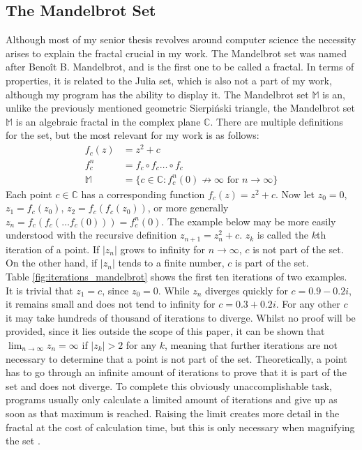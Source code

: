 \documentclass[12pt,a4paper,titlepage]{article}
\begin{document}
	\subsection{The Mandelbrot Set}
	Although most of my senior thesis revolves around computer science the necessity arises to explain the fractal crucial in my work. The Mandelbrot set was named after Benoît B. Mandelbrot, and is the first one to be called a fractal. In terms of properties, it is related to the Julia set, which is also not a part of my work, although my program has the ability to display it. The Mandelbrot set \(\mathbb{M}\) is an, unlike the previously mentioned geometric Sierpiński triangle, the Mandelbrot set \(\mathbb{M}\) is an algebraic fractal in the complex plane \(\mathbb{C}\). There are multiple definitions for the set, but the most relevant for my work is as follows:
	\begin{align*}
			f_{c}(z)&=z^2 + c\\
			f_{c}^{n} &= f_{c} \circ f_{c} \dots \circ f_{c}\\
			\mathbb{M} &= \{c \in \mathbb{C}: f_{c}^{n}(0)\not\to\infty \text{ for } n \to \infty\}
	\end{align*}
	Each point \(c \in \mathbb{C}\) has a corresponding function \(f_c(z)=z^2 +c\). Now let \(z_0=0\), \(z_1 = f_c(z_0)\), \(z_2 = f_c(f_c(z_0))\), or more generally \(z_n = f_c(f_c(\dots f_c(0)))= f_c^n(0)\). The example below may be more easily understood with the recursive definition \(z_{n+1}=z_n^2+c\). \(z_k\) is called the \(k\)th iteration of a point. If \(|z_n|\) grows to infinity for \(n \to \infty\), \(c\) is not part of the set. On the other hand, if \(|z_n|\) tends to a finite number, \(c\) is part of the set.\\
	Table \ref{fig:iterations_mandelbrot} shows the first ten iterations of two examples. It is trivial that \(z_1=c\), since \(z_0 = 0\). While \(z_n\) diverges quickly for \(c=0.9 - 0.2i\), it remains small and does not tend to infinity for \(c=0.3+0.2i\). For any other \(c\) it may take hundreds of thousand of iterations to diverge. Whilst no proof will be provided, since it lies outside the scope of this paper, it can be shown that \(\lim_{n\to\infty}z_{n} = \infty\) if \(|z_{k}| > 2\) for any \(k\), meaning that further iterations are not necessary to determine that a point is not part of the set. Theoretically, a point has to go through an infinite amount of iterations to prove that it is part of the set and does not diverge. To complete this obviously unaccomplishable task, programs usually only calculate a limited amount of iterations and give up as soon as that maximum is reached. Raising the limit creates more detail in the fractal at the cost of calculation time, but this is only necessary when magnifying the set \cite[Chapter 14.2]{FalconerKennethJ1993FG:m}.
\end{document}

